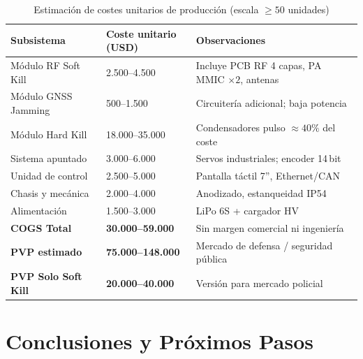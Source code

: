 \documentclass[12pt,a4paper]{article}
\begin{document}
\begin{table}[H]
\centering
\caption{Estimación de costes unitarios de producción (escala $\geq 50$ unidades)}
\label{tab:costes}
\renewcommand{\arraystretch}{1.3}
\begin{tabularx}{\textwidth}{>{\hsize=1.2\hsize}X X X}
\toprule
\textbf{Subsistema} &
\textbf{Coste unitario (USD)} &
\textbf{Observaciones} \\
\midrule
Módulo RF Soft Kill &
  2.500–4.500 &
  Incluye PCB RF 4 capas, PA MMIC $\times 2$, antenas \\[3pt]

Módulo GNSS Jamming &
  500–1.500 &
  Circuitería adicional; baja potencia \\[3pt]

Módulo Hard Kill &
  18.000–35.000 &
  Condensadores pulso $\approx 40\%$ del coste \\[3pt]

Sistema apuntado &
  3.000–6.000 &
  Servos industriales; encoder 14\,bit \\[3pt]

Unidad de control &
  2.500–5.000 &
  Pantalla táctil 7'', Ethernet/CAN \\[3pt]

Chasis y mecánica &
  2.000–4.000 &
  Anodizado, estanqueidad IP54 \\[3pt]

Alimentación &
  1.500–3.000 &
  LiPo 6S + cargador HV \\[3pt]

\midrule
\textbf{COGS Total} &
  \textbf{30.000–59.000} &
  Sin margen comercial ni ingeniería \\[2pt]

\textbf{PVP estimado} &
  \textbf{75.000–148.000} &
  Mercado de defensa / seguridad pública \\[2pt]

\textbf{PVP Solo Soft Kill} &
  \textbf{20.000–40.000} &
  Versión para mercado policial \\
\bottomrule
\end{tabularx}
\end{table}

\newpage

\section*{Conclusiones y Próximos Pasos}
\end{document}
